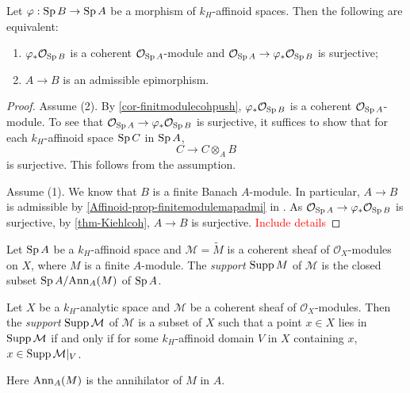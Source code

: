 \begin{corollary}\label{cor-admissibleepisheaf}
    Let $\varphi:\operatorname{Sp} B\rightarrow \operatorname{Sp} A$ be a morphism of $k_H$-affinoid spaces. Then the following are equivalent:
    \begin{enumerate}
        \item $\varphi_*\mathcal{O}_{\operatorname{Sp} B}$ is a coherent $\mathcal{O}_{\operatorname{Sp} A}$-module and $\mathcal{O}_{\operatorname{Sp} A}\rightarrow \varphi_*\mathcal{O}_{\operatorname{Sp} B}$ is surjective;
        \item $A\rightarrow B$ is an admissible epimorphism.
    \end{enumerate}
\end{corollary}
\begin{proof}
    Assume (2). By \cref{cor-finitmodulecohpush}, $\varphi_*\mathcal{O}_{\operatorname{Sp} B}$ is a coherent $\mathcal{O}_{\operatorname{Sp} A}$-module. To see that  $\mathcal{O}_{\operatorname{Sp} A}\rightarrow \varphi_*\mathcal{O}_{\operatorname{Sp} B}$ is surjective, it suffices to show that for each $k_H$-affinoid space $\operatorname{Sp} C$ in $\operatorname{Sp} A$,
    \[
        C\rightarrow C\otimes_A B  
    \]
    is surjective. This follows from the assumption.

    Assume (1). We know that $B$ is a finite Banach $A$-module. In particular, $A\rightarrow B$ is admissible by \cref{Affinoid-prop-finitemodulemapadmi} in .
    As $\mathcal{O}_{\operatorname{Sp} A}\rightarrow \varphi_*\mathcal{O}_{\operatorname{Sp} B}$ is surjective, by \cref{thm-Kiehlcoh}, $A\rightarrow B$ is surjective. \textcolor{red}{Include details}
\end{proof}


\begin{definition}
    Let $\operatorname{Sp} A$ be a $k_H$-affinoid space and $\mathcal{M}=\tilde{M}$ is a coherent sheaf of $\mathcal{O}_X$-modules on $X$, where $M$ is a finite $A$-module. The \emph{support} $\operatorname{Supp} M$ of $\mathcal{M}$ is the closed subset $\operatorname{Sp} A/\mathrm{Ann}_A(M)$ of $\operatorname{Sp} A$.

    Let $X$ be a $k_H$-analytic space and $\mathcal{M}$ be a coherent sheaf of $\mathcal{O}_X$-modules. Then the \emph{support} $\operatorname{Supp} \mathcal{M}$ of $\mathcal{M}$ is a subset of $X$ such that a point $x\in X$ lies in $\operatorname{Supp} \mathcal{M}$ if and only if for some  $k_H$-affinoid domain $V$ in $X$ containing $x$, $x\in \operatorname{Supp} \mathcal{M}|_V$.
\end{definition}
Here $\mathrm{Ann}_A(M)$ is the annihilator of $M$ in $A$.

